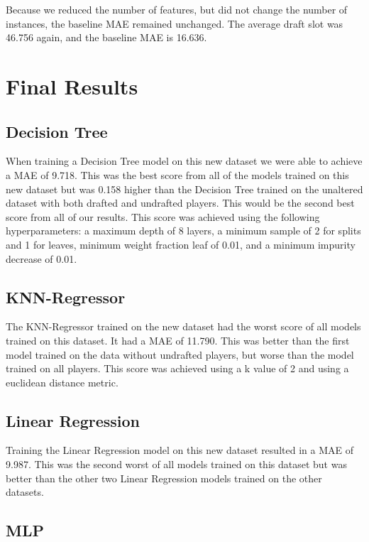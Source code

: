 \documentclass{article}
\begin{document}
Because we reduced the number of features, but did not change the number of
instances, the baseline MAE remained unchanged. The average draft slot was
46.756 again, and the baseline MAE is 16.636.

\section{Final Results}

\subsection{Decision Tree}

When training a Decision Tree model on this new dataset we were able to achieve
a MAE of 9.718. This was the best score from all of the models trained on this
new dataset but was 0.158 higher than the Decision Tree trained on the unaltered
dataset with both drafted and undrafted players. This would be the second best
score from all of our results. This score was achieved using the following
hyperparameters: a maximum depth of 8 layers, a minimum sample of 2 for splits
and 1 for leaves, minimum weight fraction leaf of 0.01, and a minimum impurity
decrease of 0.01.

\subsection{KNN-Regressor}

The KNN-Regressor trained on the new dataset had the worst score of all models
trained on this dataset. It had a MAE of 11.790. This was better than the first
model trained on the data without undrafted players, but worse than the model
trained on all players. This score was achieved using a k value of 2 and using a
euclidean distance metric.

\subsection{Linear Regression}

Training the Linear Regression model on this new dataset resulted in a MAE of
9.987. This was the second worst of all models trained on this dataset but was
better than the other two Linear Regression models trained on the other
datasets.

\subsection{MLP}
\end{document}
